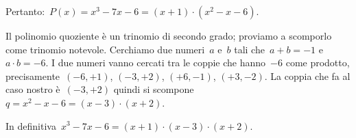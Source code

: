 \begin{exrig}
\begin{esempio}
\begin{multicols}{2}
\end{multicols}

Pertanto:~$P(x)=x^{{3}}-7x-6=\left(x+1\right)\cdot \left(x^{2}-x-6\right)$.

Il polinomio quoziente è un trinomio di secondo grado; proviamo a
scomporlo come trinomio notevole.
Cerchiamo due numeri~$a$ e~$b$ tali che~$a+b=-1$ e~$a\cdot b=-6$.
I due numeri vanno cercati tra le coppie che hanno~$-6$ come prodotto,
precisamente~$(-6, +1)$, $(-3, +2)$, $(+6,-1)$, $(+3,-2)$. La coppia che fa al
caso nostro è~$(-3, +2)$ quindi si
scompone~$q=x^{2}-x-6=\left(x-3\right)\cdot \left(x+2\right)$.

In definitiva~$x^{{3}}-7x-6=\left(x+1\right)\cdot (x-3)\cdot (x+2)$.

 \end{esempio}
%  
% 
% 
% 
% 
% 
% 
% 
% 
% 
% 
% 


\end{exrig}
